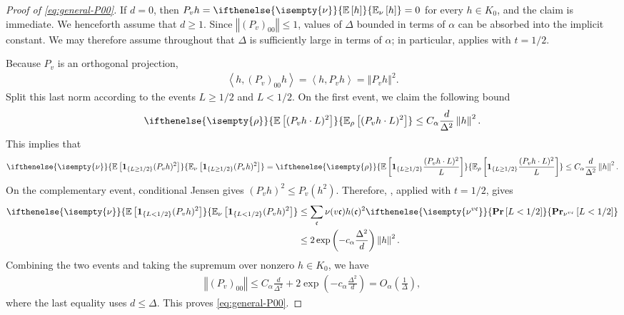 \documentclass[a4paper,12pt]{article}
\theoremstyle{plain}
\theoremstyle{definition}
\def\*#1{\mathbf{#1}} %
\def\!#1{\mathfrak{#1}} %
\def\*#1{\boldsymbol{#1}} %
\def\!#1{\mathfrak{#1}} %
\def\oPr{\mathbf{Pr}}
\renewcommand{\Pr}[2][]{ \ifthenelse{\isempty{#1}}
  {\oPr\left[#2\right]}
  {\oPr_{#1}\left[#2\right]} } %
\def\oE{\mathbb{E}}
\newcommand{\E}[2][]{ \ifthenelse{\isempty{#1}}
  {\oE\left[#2\right]}
  {\oE_{#1}\left[#2\right]} }
\newcommand{\norm}[1]{\left\Vert#1\right\Vert}
\newcommand{\set}[1]{\left\{#1\right\}}
\newcommand{\tuple}[1]{\left(#1\right)}
\newcommand{\inner}[2]{\left\langle #1,#2\right\rangle}
\newcommand{\tp}{\tuple}
\newcommand{\todo}[1]{{\color{red}TODO: #1}}
\begin{document}
\begin{proof}[Proof of \eqref{eq:general-P00}]
If $d=0$, then $P_vh=\E[\nu]{h}=0$ for every $h\in K_0$, and the
claim is immediate.  We henceforth assume that $d\geq1$.
Since $\norm{(P_v)_{00}}\leq1$, values of $\Delta$ bounded in terms of
$\alpha$ can be absorbed into the implicit constant.  We may therefore
assume throughout that $\Delta$ is sufficiently large in terms of
$\alpha$; in particular, 
applies with $t=1/2$.

Because $P_v$ is an orthogonal projection,
\begin{align*}
  \inner{h}{(P_v)_{00}h}
  =\inner{h}{P_vh}
  =\norm{P_vh}^2.
\end{align*}
Split this last norm according to the events $L\geq1/2$ and $L<1/2$.
On the first event, we claim the following bound
\begin{align} \label{eq:general-P00-second-moment-target}
  \E[\rho]{(P_vh \cdot L)^2} \leq C_\alpha\frac{d}{\Delta^2} \norm{h}^2.
\end{align}
This implies that
\begin{align*} 
  \E[\nu]{
    \*1_{\set{L\geq1/2}}(P_vh)^2
  }
  =
  \E[\rho]{
    \*1_{\set{L\geq1/2}}\frac{(P_vh \cdot L)^2}{L}
  }
  \leq
  C_\alpha\frac{d}{\Delta^2}\norm{h}^2.
\end{align*}
On the complementary event, conditional Jensen gives
$(P_vh)^2\leq P_v(h^2)$.  Therefore,
, applied with $t=1/2$, gives
\begin{align*}
  \E[\nu]{
    \*1_{\set{L<1/2}}(P_vh)^2
  }
  &\leq
  \sum_{\!c}\nu(v\!c) h(\!c)^2
  \Pr[\nu^{v\!c}]{L<1/2}
  \\
  &\leq
  2\exp\tp{-c_\alpha\frac{\Delta^2}{d}}
  \norm{h}^2.
\end{align*}
Combining the two events and taking the supremum over nonzero
$h\in K_0$, we have
\begin{align*}
  \norm{(P_v)_{00}}
  \leq
  C_\alpha\frac{d}{\Delta^2}
  +2\exp\tp{-c_\alpha\frac{\Delta^2}{d}}
  =O_\alpha\tp{\frac1\Delta},
\end{align*}
where the last equality uses $d\leq\Delta$.  This proves
\eqref{eq:general-P00}.



\end{proof}
\end{document}
